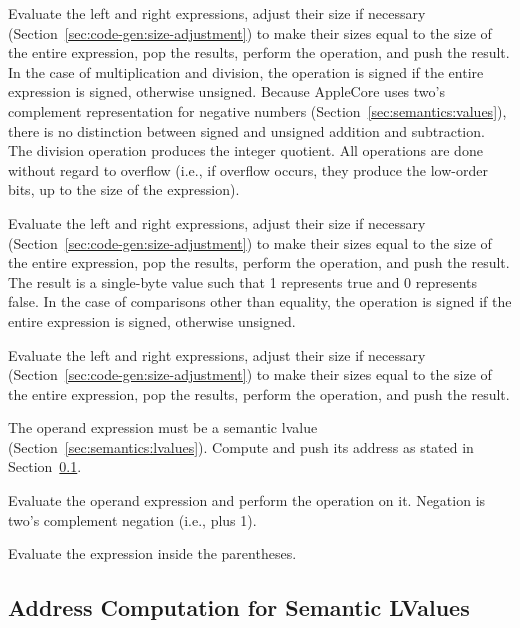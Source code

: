 \documentclass[10pt]{article}
\begin{document}
 Evaluate the left and right expressions, adjust their
size if necessary (Section~\ref{sec:code-gen:size-adjustment}) to make
their sizes equal to the size of the entire expression, pop the
results, perform the operation, and push the result.  In the case of
multiplication and division, the operation is signed if the entire
expression is signed, otherwise unsigned.  Because AppleCore uses
two's complement representation for negative numbers
(Section~\ref{sec:semantics:values}), there is no distinction between
signed and unsigned addition and subtraction.  The division operation
produces the integer quotient.  All operations are done without regard
to overflow (i.e., if overflow occurs, they produce the low-order
bits, up to the size of the expression).

 Evaluate the left and right expressions, adjust
their size if necessary (Section~\ref{sec:code-gen:size-adjustment})
to make their sizes equal to the size of the entire expression, pop
the results, perform the operation, and push the result.  The result
is a single-byte value such that 1 represents true and 0 represents
false.  In the case of comparisons other than equality, the operation
is signed if the entire expression is signed, otherwise unsigned.

Evaluate the left and right expressions, adjust their size if
necessary (Section~\ref{sec:code-gen:size-adjustment}) to make their
sizes equal to the size of the entire expression, pop the results,
perform the operation, and push the result.

 
The operand expression must be a semantic lvalue
(Section~\ref{sec:semantics:lvalues}).  Compute and push its address
as stated in Section~\ref{sec:code-gen:lvalues}.

Evaluate the operand expression and perform the operation on it.
Negation is two's complement negation (i.e.,  plus 1).

 Evaluate the expression inside the
parentheses.

\subsection{Address Computation for Semantic LValues}
\label{sec:code-gen:lvalues}
\end{document}
